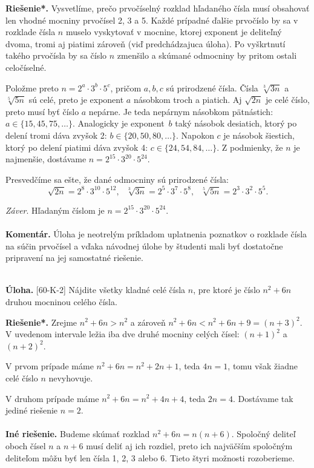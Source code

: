 \documentclass[11pt,a4paper,oneside,final]{book}
\newcommand{\kom}{\textbf{Komentár.} }
\newcommand{\ul}{\textbf{Úloha.} }
\newcommand{\rieh}{\textbf{Riešenie*.} }
\begin{document}
\rieh Vysvetlíme, prečo prvočíselný rozklad hľadaného čísla musí obsahovať len vhodné mocniny prvočísel 2, 3 a 5. Každé prípadné ďalšie prvočíslo by sa v rozklade čísla $n$ muselo vyskytovať v mocnine, ktorej exponent je deliteľný dvoma, tromi aj piatimi zároveň (viď predchádzajuca úloha). Po vyškrtnutí takého prvočísla by sa číslo $n$ zmenšilo a skúmané odmocniny by pritom ostali celočíselné.

Položme preto $n = 2^a \cdot 3^b \cdot 5^c$, pričom $a, b, c$ sú prirodzené čísla. Čísla $\sqrt[3]{3n}$ a $\sqrt[5]{5n}$ sú celé, preto je exponent $a$ násobkom troch a piatich. Aj $\sqrt{2n}$ je celé číslo, preto musí byť číslo $a$ nepárne. Je teda nepárnym násobkom pätnástich: $a \in \{15, 45, 75, \ldots\}$. Analogicky je exponent~$b$ taký násobok desiatich, ktorý po delení tromi dáva zvyšok 2: $b \in \{20, 50, 80, \ldots\}$. Napokon $c$ je násobok šiestich, ktorý po delení piatimi dáva zvyšok 4: $c \in \{24, 54, 84, \ldots\}$. Z podmienky, že $n$ je najmenšie, dostávame $n = 2^{15} \cdot3^{20} \cdot 5^{24}$.

Presvedčíme sa ešte, že dané odmocniny sú prirodzené čísla:
$$\sqrt{2n} = 2^8 \cdot 3^{10} \cdot 5^{12},\ \ \ \sqrt[3]{3n} = 2^5 \cdot 3^7 \cdot 5^8, \ \ \ \sqrt[5]{5n} = 2^3 \cdot 3^2 \cdot5^5.$$

\textit{Záver}. Hľadaným číslom je $n = 2^{15} \cdot 3^{20} \cdot 5^{24}$.\\
\\
\kom Úloha je neotrelým príkladom uplatnenia poznatkov o rozklade čísla na súčin prvočísel a vďaka návodnej úlohe by študenti mali byť dostatočne pripravení na jej samostatné riešenie.\\
\\
\begin{tcolorbox}[breakable,notitle,boxrule=0pt,colback=light-gray,colframe=light-gray]\ul [60-K-2]
Nájdite všetky kladné celé čísla $n$, pre ktoré je číslo $n^2 + 6n$ druhou mocninou celého čísla.

\end{tcolorbox}

\rieh Zrejme $n^2 +6n > n^2$ a zároveň $n^2 +6n < n^2 +6n+9 = (n+3)^2$. V uvedenom intervale ležia iba dve druhé mocniny celých čísel: $(n + 1)^2$ a $(n + 2)^2$.

V prvom prípade máme $n^2 + 6n = n^2 + 2n + 1$, teda $4n = 1$, tomu však žiadne celé číslo $n$ nevyhovuje.

V druhom prípade máme $n^2 + 6n = n^2 + 4n + 4$, teda $2n = 4$. Dostávame tak jediné riešenie $n = 2$.\\
\\
\textbf{Iné riešenie.} Budeme skúmať rozklad $n^2 + 6n = n(n+ 6)$. Spoločný deliteľ oboch čísel $n$ a $n + 6$ musí deliť aj ich rozdiel, preto ich najväčším spoločným deliteľom môžu byť len čísla 1, 2, 3 alebo 6. Tieto štyri možnosti rozoberieme.
\end{document}
